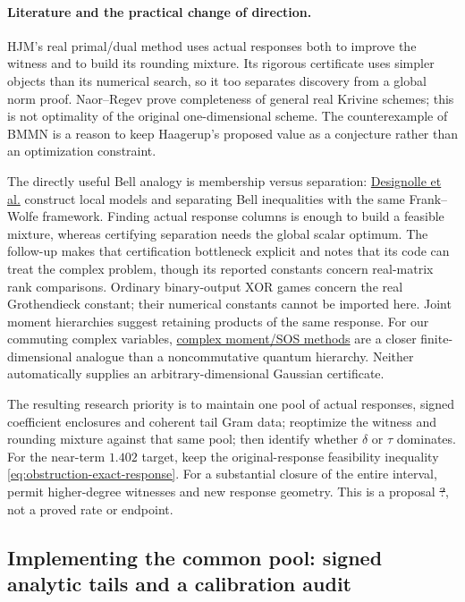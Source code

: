 \paragraph{Literature and the practical change of direction.}
HJM's real primal/dual method \cite{HJMreal26} uses actual responses
both to improve the witness and to build its rounding mixture. Its
rigorous certificate uses simpler objects than its numerical search,
so it too separates discovery from a global norm proof. Naor--Regev
\cite{NR14} prove completeness of general real Krivine schemes;
this is not optimality of the original one-dimensional scheme.
The counterexample of BMMN \cite{BMMN13} is a reason to keep
Haagerup's proposed value as a conjecture rather than an optimization
constraint.

The directly useful Bell analogy is membership versus separation:
\href{https://arxiv.org/html/2302.04721v3}{Designolle et al.}
construct local models and separating Bell inequalities with the same
Frank--Wolfe framework. Finding actual response columns is enough to
build a feasible mixture, whereas certifying separation needs the
global scalar optimum. The follow-up \cite{DVP24} makes that
certification bottleneck explicit and notes that its code can treat
the complex problem, though its reported constants concern real-matrix
rank comparisons. Ordinary binary-output XOR games concern the real
Grothendieck constant; their numerical constants cannot be imported here.
Joint moment hierarchies suggest retaining products of the same
response. For our commuting complex variables,
\href{https://arxiv.org/abs/1508.02068}{complex moment/SOS methods}
are a closer finite-dimensional analogue than a noncommutative quantum
hierarchy. Neither automatically supplies an arbitrary-dimensional
Gaussian certificate.

The resulting research priority is to maintain one pool of actual
responses, signed coefficient enclosures and coherent tail Gram data;
reoptimize the witness and rounding mixture against that same pool;
then identify whether $\delta$ or $\tau$ dominates. For the near-term
$1.402$ target, keep the original-response feasibility inequality
\eqref{eq:obstruction-exact-response}. For a substantial closure of
the entire interval, permit higher-degree witnesses and new response
geometry. This is a proposal \st{?}, not a proved rate or endpoint.

\subsection{Implementing the common pool: signed analytic tails and a calibration audit}
\label{sec:shared-pool-implementation-20261022}
